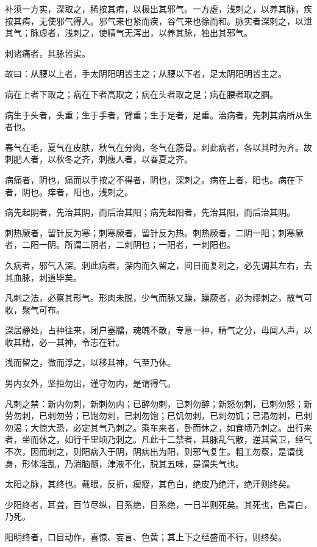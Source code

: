 \documentclass[a4paper,12pt,UTF8,twoside]{ctexbook}
\begin{document}
	补须一方实，深取之，稀按其痏，以极出其邪气。一方虚，浅刺之，以养其脉，疾按其痏，无使邪气得入。邪气来也紧而疾，谷气来也徐而和。脉实者深刺之，以泄其气；脉虚者，浅刺之，使精气无泻出，以养其脉，独出其邪气。
	
	刺诸痛者，其脉皆实。
	
	故曰：从腰以上者，手太阴阳明皆主之；从腰以下者，足太阴阳明皆主之。
	
	病在上者下取之；病在下者高取之；病在头者取之足；病在腰者取之腘。
	
	病生于头者，头重；生于手者，臂重；生于足者，足重。治病者，先刺其病所从生者也。
	
	春气在毛，夏气在皮肤，秋气在分肉，冬气在筋骨。刺此病者，各以其时为齐。故刺肥人者，以秋冬之齐，刺瘦人者，以春夏之齐。
	
	病痛者，阴也，痛而以手按之不得者，阴也，深刺之。病在上者，阳也。病在下者，阴也。痒者，阳也，浅刺之。
	
	病先起阴者，先治其阴，而后治其阳；病先起阳者，先治其阳，而后治其阴。
	
	刺热厥者，留针反为寒；刺寒厥者，留针反为热。刺热厥者，二阴一阳；刺寒厥者，二阳一阴。所谓二阴者，二刺阴也；一阳者，一刺阳也。
	
	久病者，邪气入深。刺此病者，深内而久留之，间日而复刺之，必先调其左右，去其血脉，刺道毕矣。
	
	凡刺之法，必察其形气。形肉未脱，少气而脉又躁，躁厥者，必为缪刺之，散气可收，聚气可布。
	
	深居静处，占神往来，闭户塞牖，魂魄不散，专意一神，精气之分，毋闻人声，以收其精，必一其神，令志在针。
	
	浅而留之，微而浮之，以移其神，气至乃休。
	
	男内女外，坚拒勿出，谨守勿内，是谓得气。
	
	凡刺之禁：新内勿刺，新刺勿内；已醉勿刺，已刺勿醉；新怒勿刺，已刺勿怒；新劳勿刺，已刺勿劳；已饱勿刺，已刺勿饱；已饥勿刺，已刺勿饥；已渴勿刺，已刺勿渴；大惊大恐，必定其气乃刺之。乘车来者，卧而休之，如食顷乃刺之。出行来者，坐而休之，如行千里顷乃刺之。凡此十二禁者，其脉乱气散，逆其营卫，经气不次，因而刺之，则阳病入于阴，阴病出为阳，则邪气复生。粗工勿察，是谓伐身，形体淫乱，乃消脑髓，津液不化，脱其五味，是谓失气也。
	
	太阳之脉，其终也。戴眼，反折，瘈瘲，其色白，绝皮乃绝汗，绝汗则终矣。
	
	少阳终者，耳聋，百节尽纵，目系绝，目系绝，一日半则死矣。其死也，色青白，乃死。
	
	阳明终者，口目动作，喜惊、妄言、色黄；其上下之经盛而不行，则终矣。
	
\end{document}
